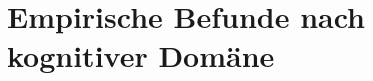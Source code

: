 


\label{subsubsec:konsolidierung}

\section{Empirische Befunde nach kognitiver Domäne}
\label{sec:befunde_domänen}


\label{subsec:motorisch}


\label{subsubsec:motor_tdcs}

